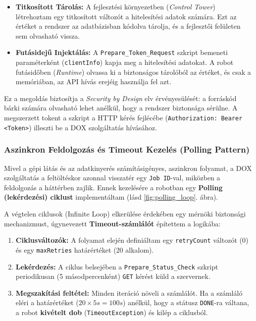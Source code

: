 \begin{itemize}
    \item \textbf{Titkosított Tárolás:} A fejlesztési környezetben (\textit{Control Tower}) létrehoztam egy titkosított változót a hitelesítési adatok számára. Ezt az értéket a rendszer az adatbázisban kódolva tárolja, és a fejlesztői felületen sem olvasható vissza.
    \item \textbf{Futásidejű Injektálás:} A \texttt{Prepare\_Token\_Request} szkript bemeneti paraméterként (\texttt{clientInfo}) kapja meg a hitelesítési adatokat. A robot futásidőben (\textit{Runtime}) olvassa ki a biztonságos tárolóból az értéket, és csak a memóriában, az API hívás erejéig használja fel azt.
\end{itemize}

Ez a megoldás biztosítja a \textit{Security by Design} elv érvényesülését: a forráskód bárki számára olvasható lehet anélkül, hogy a rendszer biztonsága sérülne. A megszerzett tokent a szkript a HTTP kérés fejlécébe (\texttt{Authorization: Bearer <Token>}) illeszti be a DOX szolgáltatás hívásához.

\subsubsection{Aszinkron Feldolgozás és Timeout Kezelés (Polling Pattern)}
\label{sssec:polling_timeout}

Mivel a gépi látás és az adatkinyerés számításigényes, aszinkron folyamat, a DOX szolgáltatás a feltöltéskor azonnal visszatér egy \texttt{Job ID}-val, miközben a feldolgozás a háttérben zajlik. Ennek kezelésére a robotban egy \textbf{Polling (lekérdezési) ciklust} implementáltam (lásd \ref{fig:polling_loop}. ábra).

A végtelen ciklusok (Infinite Loop) elkerülése érdekében egy mérnöki biztonsági mechanizmust, úgynevezett \textbf{Timeout-számlálót} építettem a logikába:

\begin{enumerate}
    \item \textbf{Ciklusváltozók:} A folyamat elején definiáltam egy \texttt{retryCount} változót (0) és egy \texttt{maxRetries} határértéket (20 alkalom).
    \item \textbf{Lekérdezés:} A ciklus belsejében a \texttt{Prepare\_Status\_Check} szkript periodikusan (5 másodpercenként) \texttt{GET} kérést küld a szervernek.
    \item \textbf{Megszakítási feltétel:} Minden iteráció növeli a számlálót. Ha a számláló eléri a határértéket ($20 \times 5s = 100s$) anélkül, hogy a státusz \texttt{DONE}-ra váltana, a robot \textbf{kivételt dob} (\texttt{TimeoutException}) és kilép a ciklusból.
\end{enumerate}

